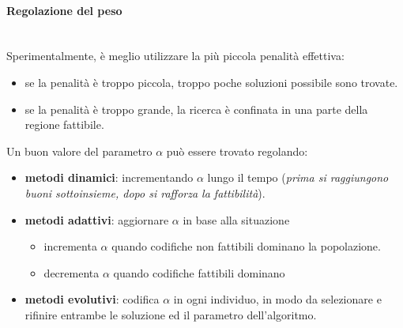 \documentclass{article}
\begin{document}
\paragraph{Regolazione del peso}\mbox{}\\
Sperimentalmente, è meglio utilizzare la più piccola penalità effettiva:
\begin{itemize}
    \item se la penalità è troppo piccola, troppo poche soluzioni possibile sono trovate.
    \item se la penalità è troppo grande, la ricerca è confinata in una parte della
    regione fattibile.
\end{itemize}
Un buon valore del parametro $\alpha$ può essere trovato regolando:
\begin{itemize}
    \item \textbf{metodi dinamici}: incrementando $\alpha$ lungo il tempo
    (\textit{prima si raggiungono buoni sottoinsieme, dopo si rafforza
    la fattibilità}).
    \item \textbf{metodi adattivi}: aggiornare $\alpha$ in base alla situazione
    \begin{itemize}
        \item incrementa $\alpha$ quando codifiche non fattibili dominano la popolazione.
        \item decrementa $\alpha$ quando codifiche fattibili dominano
    \end{itemize}
    \item \textbf{metodi evolutivi}: codifica $\alpha$ in ogni individuo, in modo
    da selezionare e rifinire entrambe le soluzione ed il parametro dell'algoritmo.
\end{itemize}
\end{document}
